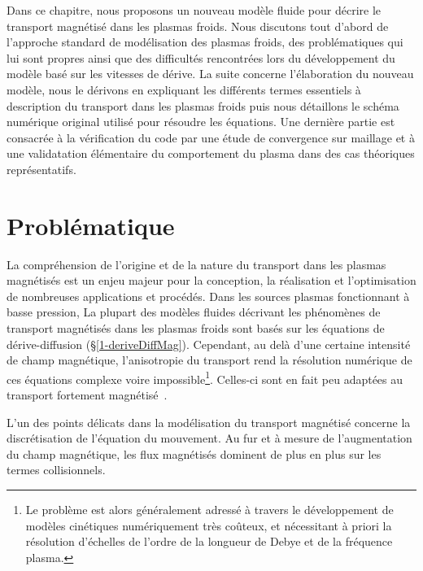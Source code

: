 \begin{refsection}


Dans ce chapitre, nous proposons un nouveau modèle fluide pour décrire le
transport magnétisé dans les plasmas froids. Nous discutons tout d'abord de
l'approche standard de modélisation des plasmas froids, des problématiques qui
lui sont propres ainsi que des difficultés rencontrées lors du développement du
modèle basé sur les vitesses de dérive. La suite concerne l'élaboration du
nouveau modèle, nous le dérivons en expliquant les différents termes essentiels
à description du transport dans les plasmas froids puis nous détaillons le
schéma numérique original utilisé pour résoudre les équations.
Une dernière partie est consacrée à la vérification du code par une étude de
convergence sur maillage et à une validatation élémentaire du comportement du
plasma dans des cas théoriques représentatifs.



\section{Problématique}

La compréhension de l'origine et de la nature du transport dans les plasmas
magnétisés est un enjeu majeur pour la conception, la réalisation et
l'optimisation de nombreuses applications et procédés. Dans les sources plasmas
fonctionnant à basse pression,  La plupart des modèles fluides décrivant les
phénomènes de transport magnétisés dans les plasmas froids sont basés sur les équations de dérive-diffusion (\S \ref{1-deriveDiffMag}). Cependant, au delà d'une certaine intensité de champ magnétique, l'anisotropie du transport rend la résolution numérique de ces
équations complexe voire impossible\footnote{Le problème est alors généralement
adressé à travers le développement de modèles cinétiques numériquement très
coûteux, et nécessitant à priori la résolution d'échelles de l'ordre de la
longueur de Debye et de la fréquence plasma.}.
Celles-ci sont en fait peu adaptées au transport fortement
magnétisé~\cite{Golant}.

L'un des points délicats dans la modélisation du transport magnétisé concerne la
discrétisation de l'équation du mouvement. Au fur et à mesure de l'augmentation
du champ magnétique, les flux magnétisés dominent de plus en plus sur les termes
collisionnels.


\end{refsection}
